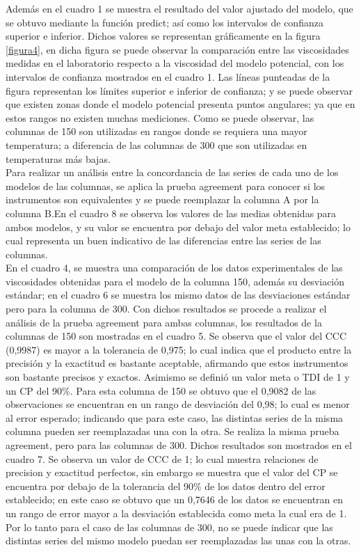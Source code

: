 \documentclass[12pt, letterpaper]{article}
\begin{document}
Además en el cuadro 1 se muestra el resultado del valor ajustado del modelo, que se obtuvo mediante la función predict; así como los intervalos de confianza superior e inferior. Dichos valores se representan gráficamente en la figura \ref{figura4}, en dicha figura se puede observar la comparación entre las viscosidades medidas en el laboratorio respecto a la viscosidad del modelo potencial, con los intervalos de confianza mostrados en el cuadro 1. Las líneas punteadas de la figura representan los límites superior e inferior de confianza; y se puede observar que existen zonas donde el modelo potencial presenta puntos angulares; ya que en estos rangos no existen muchas mediciones. Como se puede observar, las columnas de 150 son utilizadas en rangos donde se requiera una mayor temperatura; a diferencia de las columnas de 300 que son utilizadas en temperaturas más bajas.\\ 
Para realizar un análisis entre la concordancia de las series de cada uno de los modelos de las columnas, se aplica la prueba agreement para conocer si los instrumentos son equivalentes y se puede reemplazar la columna A por la columna B.En el cuadro 8 se observa los valores de las medias obtenidas para ambos modelos, y su valor se encuentra por debajo del valor meta establecido; lo cual representa un buen indicativo de las diferencias entre las series de las columnas.\\
En el cuadro 4, se muestra una comparación de los datos experimentales de las viscosidades obtenidas para el modelo de la columna 150, además su desviación estándar; en el cuadro 6 se muestra los mismo datos de las desviaciones estándar pero para la columna de 300. Con dichos resultados se procede a realizar el análisis de la prueba agreement para ambas columnas, los resultados de la columnas de 150 son mostradas en el cuadro 5. Se observa que el valor del CCC (0,9987) es mayor a la tolerancia de 0,975; lo cual indica que el producto entre la precisión y la exactitud es bastante aceptable, afirmando que estos instrumentos son bastante precisos y exactos. Asimismo se definió un valor meta o TDI de 1 y un CP del 90\%. Para esta columna de 150 se obtuvo que el 0,9082 de las observaciones se encuentran en un rango de desviación del 0,98; lo cual es menor al error esperado; indicando que para este caso, las distintas series de la misma columna pueden ser reemplazadas una con la otra. 
Se realiza la misma prueba agreement, pero para las columnas de 300. Dichos resultados son mostrados en el cuadro 7. Se observa un valor de CCC de 1; lo cual muestra relaciones de precision y exactitud perfectos, sin embargo se muestra que el valor del CP se encuentra por debajo de la tolerancia del 90\% de los datos dentro del error establecido; en este caso se obtuvo que un 0,7646 de los datos se encuentran en un rango de error mayor a la desviación establecida como meta la cual era de 1. Por lo tanto para el caso de las columnas de 300, no se puede indicar que las distintas series del mismo modelo puedan ser reemplazadas las unas con la otras.\\ 
\end{document}
